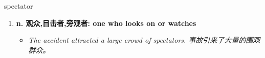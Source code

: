 
\begin{frame}
{\huge spectator}
\begin{center}
\begin{enumerate}\Large
  \item \textbf{n. 观众,目击者,旁观者: one who looks on or watches}
  \begin{itemize}
    \item \em{\Large{The accident attracted a large crowd of spectators. 事故引来了大量的围观群众。}}
  \end{itemize}
\end{enumerate}
\end{center}
\end{frame}
